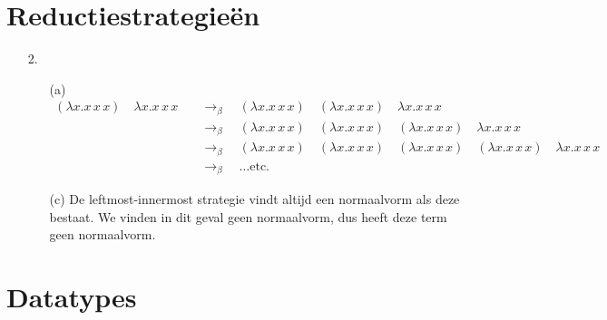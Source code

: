\documentclass[a4paper,11pt]{article}
\begin{document}
\section{Reductiestrategie\"en}


\begin{enumerate}


\item[2.]

\begin{enumerate}

\item[(a)]
\begin{align*}
  (\lambda x. x \, x \, x) \quad \lambda x. x \, x \, x
  & \quad \rightarrow_{\beta} \quad
  (\lambda x. x \, x \, x) \quad (\lambda x. x \, x \, x) \quad \lambda x. x \, x \, x\\
  & \quad \rightarrow_{\beta} \quad
  (\lambda x. x \, x \, x) \quad (\lambda x. x \, x \, x) \quad (\lambda x. x \, x \, x) \quad \lambda x. x \, x \, x\\
  & \quad \rightarrow_{\beta} \quad
  (\lambda x. x \, x \, x) \quad (\lambda x. x \, x \, x) \quad (\lambda x. x \, x \, x) \quad (\lambda x. x \, x \, x) \quad \lambda x. x \, x \, x\\
  & \quad \rightarrow_{\beta} \quad
  \ldots \text{etc.}
\end{align*}

\item[(c)]
De leftmost-innermost strategie vindt altijd een normaalvorm als deze bestaat.
We vinden in dit geval geen normaalvorm, dus heeft deze term geen normaalvorm. 

\end{enumerate}


\end{enumerate}


\section{Datatypes}
\end{document}
